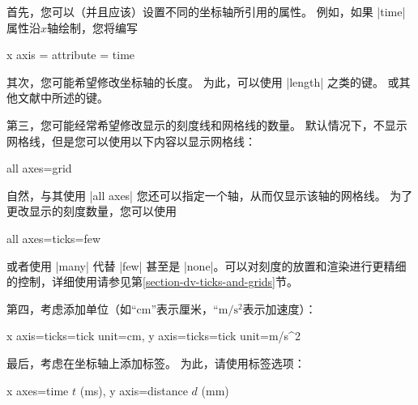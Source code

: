 首先，您可以（并且应该）设置不同的坐标轴所引用的属性。 例如，如果 |time| 属性沿$x$轴绘制，您将编写
%
\begin{codeexample}
x axis = {attribute = time}
\end{codeexample}


其次，您可能希望修改坐标轴的长度。 为此，可以使用 |length| 之类的键。 或其他文献中所述的键。


第三，您可能经常希望修改显示的刻度线和网格线的数量。 默认情况下，不显示网格线，但是您可以使用以下内容以显示网格线：
%
\begin{codeexample}
all axes={grid}
\end{codeexample}
%
%
自然，与其使用 |all axes| 您还可以指定一个轴，从而仅显示该轴的网格线。 为了更改显示的刻度数量，您可以使用
%
\begin{codeexample}
all axes={ticks=few}
\end{codeexample}
%
%
或者使用 |many| 代替 |few| 甚至是 |none|。可以对刻度的放置和渲染进行更精细的控制，详细使用请参见第\ref{section-dv-ticks-and-grids}节。


第四，考虑添加单位（如``cm''表示厘米，``$\mathrm{m}/\mathrm{s}^2$表示加速度）：
%
\begin{codeexample}
x axis={ticks={tick unit=cm}}, y axis={ticks={tick unit=m/s^2}}
\end{codeexample}


最后，考虑在坐标轴上添加标签。 为此，请使用标签选项：
%
\begin{codeexample}
x axes={time $t$ (ms)}, y axis={distance $d$ (mm)}
\end{codeexample}

